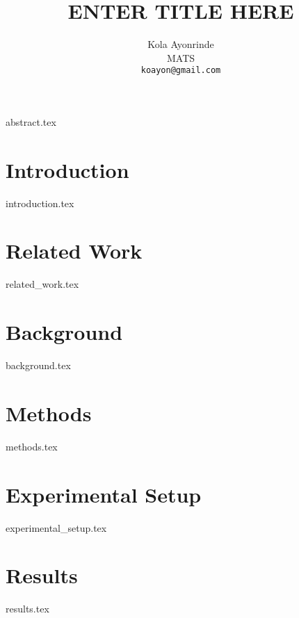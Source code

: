 \documentclass{article} %
\title{ENTER TITLE HERE}
\author{{\hspace{1mm}Kola Ayonrinde} \\
        MATS \\
	\texttt{koayon@gmail.com} \\
}
\begin{document}
\maketitle





{abstract.tex}

\section{Introduction}
\label{sec:intro}
{introduction.tex}


\section{Related Work}
\label{sec:related_work}
{related_work.tex}

\section{Background}
\label{sec:background}
{background.tex}

\section{Methods}
\label{sec:methods}
{methods.tex}


\hypertarget{setup}{%
\section{Experimental Setup}\label{setup}}
{experimental_setup.tex}

\section{Results}
\label{sec:results}
{results.tex}
\end{document}
